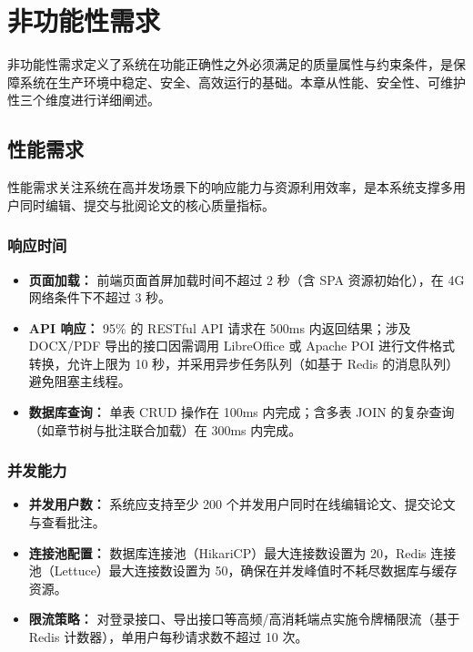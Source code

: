 \documentclass{../softeng}
\begin{document}
\section{非功能性需求}

非功能性需求定义了系统在功能正确性之外必须满足的质量属性与约束条件，是保障系统在生产环境中稳定、安全、高效运行的基础。本章从性能、安全性、可维护性三个维度进行详细阐述。

\subsection{性能需求}

性能需求关注系统在高并发场景下的响应能力与资源利用效率，是本系统支撑多用户同时编辑、提交与批阅论文的核心质量指标。

\subsubsection{响应时间}

\begin{itemize}
    \item \textbf{页面加载：} 前端页面首屏加载时间不超过 2 秒（含 SPA 资源初始化），在 4G 网络条件下不超过 3 秒。
    \item \textbf{API 响应：} 95\% 的 RESTful API 请求在 500ms 内返回结果；涉及 DOCX/PDF 导出的接口因需调用 LibreOffice 或 Apache POI 进行文件格式转换，允许上限为 10 秒，并采用异步任务队列（如基于 Redis 的消息队列）避免阻塞主线程。
    \item \textbf{数据库查询：} 单表 CRUD 操作在 100ms 内完成；含多表 JOIN 的复杂查询（如章节树与批注联合加载）在 300ms 内完成。
\end{itemize}

\subsubsection{并发能力}

\begin{itemize}
    \item \textbf{并发用户数：} 系统应支持至少 200 个并发用户同时在线编辑论文、提交论文与查看批注。
    \item \textbf{连接池配置：} 数据库连接池（HikariCP）最大连接数设置为 20，Redis 连接池（Lettuce）最大连接数设置为 50，确保在并发峰值时不耗尽数据库与缓存资源。
    \item \textbf{限流策略：} 对登录接口、导出接口等高频/高消耗端点实施令牌桶限流（基于 Redis 计数器），单用户每秒请求数不超过 10 次。
\end{itemize}
\end{document}
